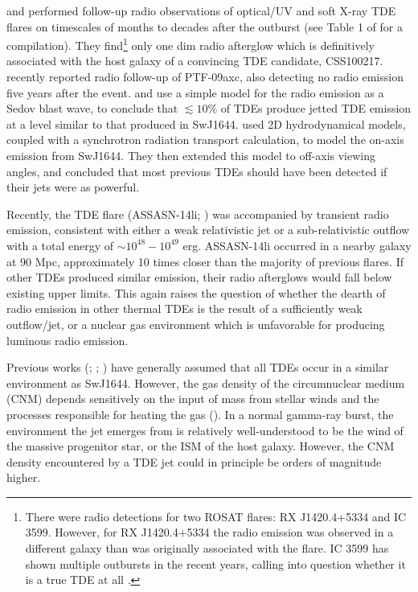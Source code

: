 \documentclass[usenatbib,fleqn]{mnras}
\begin{document}
\citet{Bower+2013} and \citet{van-Velzen+2013} performed follow-up
radio observations of optical/UV and soft X-ray TDE flares on timescales
of months to decades after the outburst (see Table 1 of
\citealt{Mimica+2015} for a compilation). They find\footnote{There were radio detections for two
  ROSAT flares: RX J1420.4+5334 and IC 3599. However, for RX
  J1420.4+5334 the radio emission was observed in a different galaxy
  than was originally associated with the flare.  IC 3599 has shown
  multiple outbursts in the recent years, calling into question
  whether it is a true TDE at all \citep{Campana+2015}.} only one dim radio
afterglow which is definitively associated with the host galaxy of a convincing TDE
candidate, CSS100217.  \citet{Arcavi+2014} recently reported radio follow-up of PTF-09axc, also detecting no radio emission five years after the event. \citet{Bower+2013} and \citet{van-Velzen+2013} use a simple
model for the radio emission as a Sedov blast wave, to conclude that
$\lesssim 10\%$ of TDEs produce jetted TDE emission at a level similar
to that produced in SwJ1644.  \citet{Mimica+2015} used 2D
hydrodynamical models, coupled with a synchrotron radiation transport
calculation, to model the on-axis emission from SwJ1644. They then
extended this model to off-axis viewing angles, and concluded that
most previous TDEs should have been detected if their jets were as
powerful.

Recently, the TDE flare (ASSASN-14li; \citealt{Holoien+2016a}) was accompanied by transient radio emission, consistent
with either a weak relativistic jet \citep{van-Velzen+2015} or a
sub-relativistic outflow \citep{Alexander+2015,Krolik+16} with a total energy of $\sim
10^{48}-10^{49}$ erg.  ASSASN-14li occurred in a nearby galaxy at 90 Mpc, approximately 10 times closer than the majority of previous flares.  If other TDEs produced similar emission, their radio afterglows would fall below existing upper limits.  This again raises the question of whether the dearth of radio emission in other thermal TDEs is the result of a sufficiently weak outflow/jet, or a nuclear gas environment which is unfavorable for producing luminous radio emission.

Previous works (\citealt{Bower+2013}; \citealt{van-Velzen+2013};
\citealt{Mimica+2015}) have generally assumed that all TDEs occur in a similar environment as SwJ1644.  However, the gas density of the circumnuclear medium (CNM) depends sensitively on the input of mass from stellar winds and the processes responsible for heating the gas (\citealt{Quataert2004,Generozov+2015}).  In a normal gamma-ray burst, the
environment the jet emerges from is relatively well-understood to be
the wind of the massive progenitor star, or the ISM of the host
galaxy.  However, the CNM density encountered by a TDE jet could in principle be orders of magnitude higher.
\end{document}
